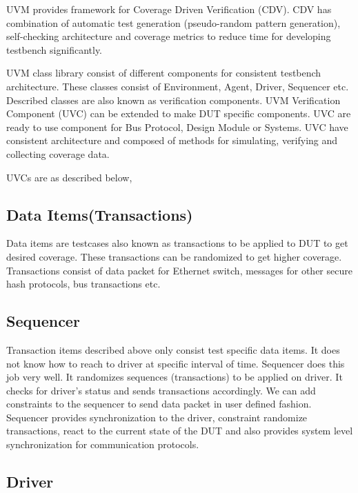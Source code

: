 UVM provides framework for Coverage Driven Verification (CDV). CDV has combination of automatic test generation (pseudo-random pattern generation), self-checking architecture and coverage metrics to reduce time for developing testbench significantly. \par

UVM class library consist of different components for consistent testbench architecture. These classes consist of Environment, Agent, Driver, Sequencer etc. Described classes are also known as verification components. UVM Verification Component (UVC) can be extended to make DUT specific components. UVC are ready to use component for Bus Protocol, Design Module or Systems. UVC have consistent architecture and composed of methods for simulating, verifying and collecting coverage data. \par

UVCs are as described below,

\subsection{Data Items(Transactions)}

Data items are testcases also known as transactions to be applied to DUT to get desired coverage. These transactions can be randomized to get higher coverage. Transactions consist of data packet for Ethernet switch, messages for other secure hash protocols, bus transactions etc. \par

\subsection{Sequencer}

Transaction items described above only consist test specific data items. It does not know how to reach to driver at specific interval of time. Sequencer does this job very well. It randomizes sequences (transactions) to be applied on driver. It checks for driver’s status and sends transactions accordingly. We can add constraints to the sequencer to send data packet in user defined fashion. Sequencer provides synchronization to the driver, constraint randomize transactions, react to the current state of the DUT and also provides system level synchronization for communication protocols.

\subsection{Driver}

